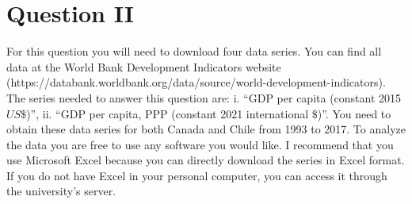\documentclass[letterpaper,12pt]{article}
\theoremstyle{dotlessS}
\begin{document}
\section*{Question II}
For this question you will need to download four data series. You can find all data at the World Bank Development Indicators website (https://databank.worldbank.org/data/source/world-development-indicators). The series needed to answer this question are: i. ``GDP per capita (constant 2015 $US\$$)'', ii. ``GDP per capita, PPP (constant 2021 international $\$$)''. You need to obtain these data series for both Canada and Chile from 1993 to 2017. To analyze the data you are free to use any software you would like. I recommend that you use Microsoft Excel because you can directly download the series in Excel format. If you do not have Excel in your personal computer, you can access it through the university's server.
\end{document}
